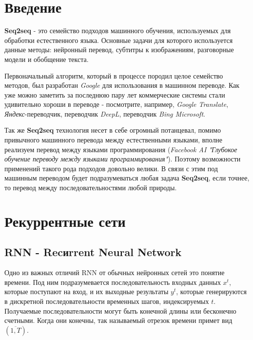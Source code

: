 \documentclass[a4paper,russian]{article}
\begin{document}
	
	
	
	\section{Введение}
	
	\textbf{Seq2seq} - это семейство подходов машинного обучения, используемых для обработки естественного языка. Основные задачи для которого используется данные методы: нейронный перевод, субтитры к изображениям, разговорные модели и обобщение текста.
	
	Первоначальный алгоритм, который в процессе породил целое семейство методов, был разработан \textit{Google} для использования в машинном переводе. Как уже можно заметить за последнюю пару лет коммерческие системы стали удивительно хороши в  переводе - посмотрите, например, \textit{Google Translate}, \textit{Яндекс}-переводчик, переводчик \textit{DeepL}, переводчик \textit{Bing Microsoft}.
	
	Так же \textbf{Seq2seq} технология несет в себе огромный потанцевал, помимо привычного машинного перевода между естественными языками, вполне реализуем перевод между языками программирования (\textit{Facebook AI "Глубокое обучение переводу между языками программирования"}). Поэтому возможности применений такого рода подходов довольно велики. В связи с этим под машинным переводом будет подразумеваться любая задача \textbf{Seq2seq}, если точнее, то перевод между последовательностями любой природы.
	
	\clearpage
	
	\section{Рекуррентные сети}
	
	\subsection{RNN - Recиrrent Neural Network}
	Одно из важных отличий RNN от обычных нейронных сетей это понятие времени. Под ним подразумевается последовательность входных данных $x^t$, которые поступают на вход, и их выходные результаты $y^t$, которые генерируются в дискретной последовательности временных шагов, индексируемых $t$. Получаемые последовательности могут быть конечной длины или бесконечно счетными. Когда они конечны, так называемый отрезок времени примет вид $(\overline{1, T})$. 
	
\end{document}
